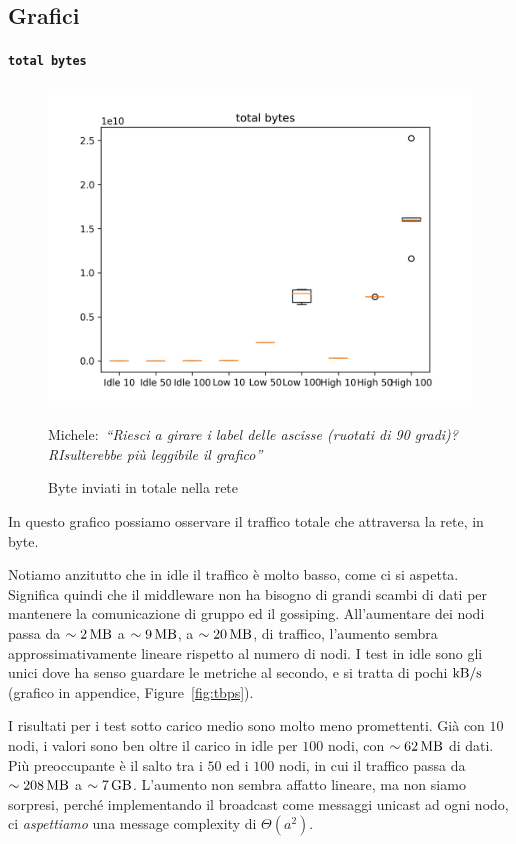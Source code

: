 \documentclass[12pt, a4paper]{article}
\newcommand{\michele}[1]{{\color{red}Michele:~}{\itshape``{#1}''}}
\begin{document}
\subsection{Grafici}

\paragraph{\lstinline{total bytes}}

\begin{figure}[H]
    \includegraphics[width=\linewidth, keepaspectratio]{graphs/total bytes.png}
    \caption{Byte inviati in totale nella rete}\michele{Riesci a girare i label delle ascisse (ruotati di 90 gradi)? RIsulterebbe più leggibile il grafico}
    \label{fig:tb}
\end{figure}

In questo grafico possiamo osservare il traffico totale che attraversa la rete, in byte.

Notiamo anzitutto che in idle il traffico è molto basso, come ci si aspetta. Significa quindi che il middleware non ha bisogno di grandi scambi di dati per mantenere la comunicazione di gruppo ed il gossiping.
All'aumentare dei nodi passa da $\sim\qty{2}{\mega\byte}$ a $\sim\qty{9}{\mega\byte}$, a $\sim\qty{20}{\mega\byte}$, di traffico, l'aumento sembra approssimativamente lineare rispetto al numero di nodi.
I test in idle sono gli unici dove ha senso guardare le metriche al secondo, e si tratta di pochi $\unit{\kilo\byte/\second}$ (grafico in appendice, Figure~\ref{fig:tbps}).

I risultati per i test sotto carico medio sono molto meno promettenti. Già con $10$ nodi, i valori sono ben oltre il carico in idle per $100$ nodi, con $\sim\qty{62}{\mega\byte}$ di dati.\\
Più preoccupante è il salto tra i $50$ ed i $100$ nodi, in cui il traffico passa da $\sim\qty{208}{\mega\byte}$ a $\sim\qty{7}{\giga\byte}$. L'aumento non sembra affatto lineare, ma non siamo sorpresi, perché implementando il broadcast come messaggi unicast ad ogni nodo, ci \emph{aspettiamo} una message complexity di $\Theta(a^2)$.
\end{document}
